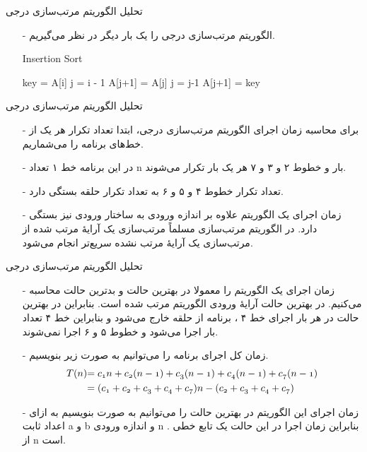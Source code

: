 \begin{frame}{‌تحلیل الگوریتم‌ مرتب‌سازی درجی}
\begin{itemize}\itemr
\item[-]
 الگوریتم مرتب‌سازی درجی را یک بار دیگر در نظر می‌گیریم.
\begin{algorithm}[H]\alglr
  \caption{Insertion Sort} 
  \begin{algorithmic}[1]
    \newline{}
        \State key = A[i]
        \State j = i - 1
          \State A[j+1] = A[j]
          \State j = j-1
        \EndWhile
        \State A[j+1] = key
      \EndFor
  \end{algorithmic}
  \label{alg:insertion-sort}
\end{algorithm}
\end{itemize}
\end{frame}


\begin{frame}{‌تحلیل الگوریتم‌ مرتب‌سازی درجی}
\begin{itemize}\itemr
\item[-]
برای محاسبه زمان اجرای الگوریتم مرتب‌سازی درجی، ابتدا تعداد تکرار هر یک از خط‌های برنامه را می‌شماریم.
\item[-]
در این برنامه خط ۱ تعداد n بار و خطوط ۲ و ۳ و ۷ هر یک
 بار تکرار می‌شوند.
\item[-]
تعداد تکرار خطوط ۴ و ۵ و ۶ به تعداد تکرار حلقه بستگی دارد.
\item[-]
زمان اجرای یک الگوریتم علاوه بر اندازه ورودی به ساختار ورودی نیز بستگی دارد. در الگوریتم مرتب‌سازی مسلماً مرتب‌سازی یک آرایهٔ مرتب شده از مرتب‌سازی یک آرایهٔ مرتب نشده سریع‌تر انجام می‌شود.
\end{itemize}
\end{frame}


\begin{frame}{‌تحلیل الگوریتم‌ مرتب‌سازی درجی}
\begin{itemize}\itemr
\item[-]
زمان اجرای یک الگوریتم را معمولا در بهترین حالت و بدترین حالت محاسبه می‌کنیم. در بهترین حالت آرایهٔ ورودی الگوریتم مرتب شده است. بنابراین در بهترین حالت در هر بار اجرای خط ۴ ، برنامه از حلقه
خارج می‌شود و بنابراین خط ۴ تعداد
بار اجرا می‌شود و خطوط ۵ و ۶ اجرا نمی‌شوند.
\item[-]
زمان کل اجرای برنامه را می‌توانیم به صورت زیر بنویسیم.
\begin{align*}
\mathnormal{T(n)} & \mathnormal{= c_1 n + c_2(n-1) + c_3(n-1) + c_4(n-1) + c_7(n-1)}\\
& \mathnormal{= (c_1 + c_2 + c_3 + c_4 + c_7)n - (c_2 + c_3 + c_4 + c_7)}
\end{align*}
\item[-]
زمان اجرای این الگوریتم در بهترین حالت را می‌توانیم به صورت
بنویسیم به ازای اعداد ثابت a و b و اندازه ورودی n .
بنابراین زمان اجرا در این حالت یک تابع خطی
از n است.
\end{itemize}
\end{frame}


